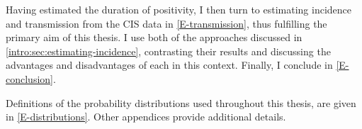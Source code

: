 \documentclass[thesis.tex]{subfiles}
\begin{document}
Having estimated the duration of positivity, I then turn to estimating incidence and transmission from the CIS data in \cref{E-transmission}, thus fulfilling the primary aim of this thesis.
I use both of the approaches discussed in \cref{intro:sec:estimating-incidence}, contrasting their results and discussing the advantages and disadvantages of each in this context.
Finally, I conclude in \cref{E-conclusion}.

Definitions of the probability distributions used throughout this thesis, are given in \cref{E-distributions}.
Other appendices provide additional details.

\ifSubfilesClassLoaded{
  \appendix
%   
  \listoftodos
}{}
\end{document}
